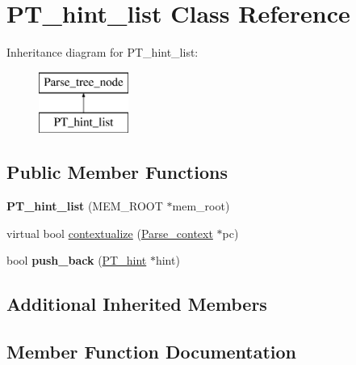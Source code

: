 \hypertarget{classPT__hint__list}{}\section{P\+T\+\_\+hint\+\_\+list Class Reference}
\label{classPT__hint__list}
Inheritance diagram for P\+T\+\_\+hint\+\_\+list\+:\begin{figure}[H]
\begin{center}
\leavevmode
\includegraphics[height=2.000000cm]{classPT__hint__list}
\end{center}
\end{figure}
\subsection*{Public Member Functions}
\begin{DoxyCompactItemize}
\item 
\mbox{\label{classPT__hint__list_a13f3345a0f267115988f7f55ad6683f0}} 
{\bfseries P\+T\+\_\+hint\+\_\+list} (M\+E\+M\+\_\+\+R\+O\+OT $\ast$mem\+\_\+root)
\item 
virtual bool \mbox{\hyperlink{classPT__hint__list_a4579688fbae2297ff9760bb352f57eeb}{contextualize}} (\mbox{\hyperlink{structParse__context}{Parse\+\_\+context}} $\ast$pc)
\item 
\mbox{\label{classPT__hint__list_a391748421b87321cfb37f49a91e00436}} 
bool {\bfseries push\+\_\+back} (\mbox{\hyperlink{classPT__hint}{P\+T\+\_\+hint}} $\ast$hint)
\end{DoxyCompactItemize}
\subsection*{Additional Inherited Members}


\subsection{Member Function Documentation}
\mbox{\label{classPT__hint__list_a4579688fbae2297ff9760bb352f57eeb}} 
